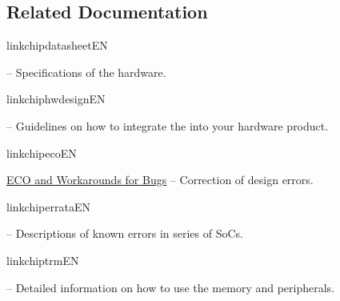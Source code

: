 
{%


\vspace{-0.5em}
\begin{minipage}{\textwidth}

\subsection*{Related Documentation}

\begin{itemize}
  \ifcsname linkchipdatasheetEN\endcsname%
    {%
      \item \doclinkcdEN{} --
        {\small Specifications of the \chipseries{} hardware.}%
    }%
  \fi%

  \ifcsname linkchiphwdesignEN\endcsname%
    {%
      \item \doclinkhdgEN{} --
        {\small Guidelines on how to integrate the \chipseries{} into your hardware product.}%
    }%
  \fi%

  \ifcsname linkchipecoEN\endcsname%
    \item \href{\linkprefix\linkchipecoEN}{\chipseries{} ECO and Workarounds for Bugs} --
        {\small Correction of \chipseries{} design errors.}
  \fi%

  \ifcsname linkchiperrataEN\endcsname%
    {%
    \item \doclinkerrataEN{} --
        {\small Descriptions of known errors in \chipseries{} series of SoCs.}
        }%
  \fi%

  \ifcsname linkchiptrmEN\endcsname%
    {%
      \item \doclinktrmEN{} --
        {\small Detailed information on how to use the \chipseries{} memory and peripherals.}%
    }%
  \fi%


\end{itemize}
\end{minipage}}
